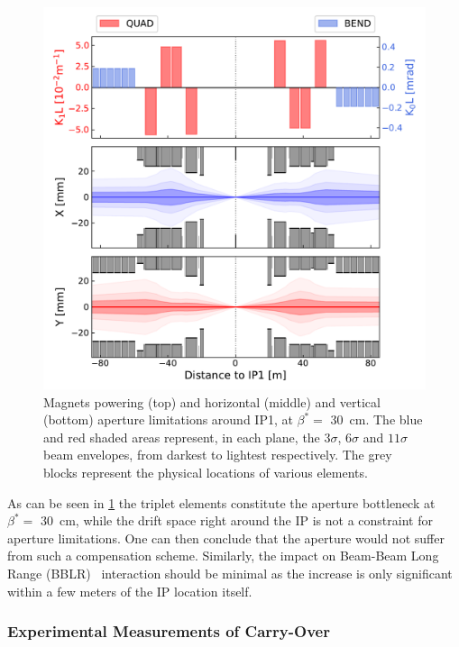 \begin{figure}[!htb]
    \centering
    \includegraphics*[width=\textwidth]{Figures/IR_Coupling_Correction/lhc_ir1_30cm_apertures.pdf}
    \caption{Magnets powering (top) and horizontal (middle) and vertical (bottom) aperture limitations around IP\num{1}, at \(\beta^{\ast} =\) \qty{30}{\centi\meter}. The \textcolor{mplb}{blue} and \textcolor{mplr}{red} shaded areas represent, in each plane, the \(3 \sigma\), \(6 \sigma\) and \(11 \sigma\) beam envelopes, from darkest to lightest respectively. The grey blocks represent the physical locations of various elements.}
    \label{figure:lhc_ir1_30cm_apertures}
\end{figure}

As can be seen in \cref{figure:lhc_ir1_30cm_apertures} the triplet elements constitute the aperture bottleneck at \(\beta^{\ast} =\) \qty{30}{\centi\meter}, while the drift space right around the IP is not a constraint for aperture limitations.
One can then conclude that the aperture would not suffer from such a compensation scheme.
Similarly, the impact on Beam-Beam Long Range (BBLR)~\cite{PHD:Poyet} interaction should be minimal as the increase is only significant within a few meters of the IP location itself.

\subsubsection*{Experimental Measurements of Carry-Over}

